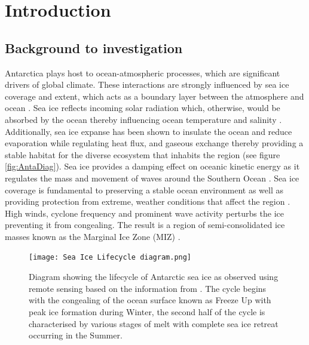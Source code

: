 \chapter{Introduction}
\label{ch:ch1}
\section{Background to investigation}
\label{sec:ch1.section1}

Antarctica plays host to ocean-atmospheric processes, which are significant drivers of global climate. These interactions are strongly influenced by sea ice coverage and extent, which acts as a boundary layer between the atmosphere and ocean \cite{parkinson2004southern}. Sea ice reflects incoming solar radiation which, otherwise, would be absorbed by the ocean thereby influencing ocean temperature and salinity \cite{parkinson2004southern}. Additionally, sea ice expanse  has been shown to insulate the ocean and reduce evaporation while regulating heat flux, and gaseous exchange \cite{deconto2003rapid} thereby providing a stable habitat for the diverse ecosystem that inhabits the region \cite{arrigo2004large} (see figure \ref{fig:AntaDiag}). Sea ice provides a damping effect on oceanic kinetic energy as it regulates the mass and movement of waves around the Southern Ocean \cite{parkinson2004southern,roach2020antarctic}. Sea ice coverage is fundamental to preserving a stable ocean environment as well as providing protection from extreme, weather conditions that affect the region \cite{vichi2019effects}. High winds, cyclone frequency and prominent wave activity perturbs the ice preventing it from congealing. The result is a region of semi-consolidated ice masses known as the Marginal Ice Zone (MIZ) \cite{vichi2019effects}.

\begin{figure}[H]
	\centering
	\texttt{[image: Sea Ice Lifecycle diagram.png]}
	\caption{Diagram showing the lifecycle of Antarctic sea ice as observed using remote sensing based on the information from \textcite{barber2005microwave}. The cycle begins with the congealing of the ocean surface known as Freeze Up with peak ice formation during Winter, the second half of the cycle is characterised by various stages of melt with complete sea ice retreat occurring in the Summer.}
	\label{fig:ice_diag}
\end{figure}

